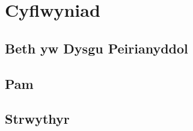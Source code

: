 \chapter{Cyflwyniad}\label{cha:introduction}



\section{Beth yw Dysgu Peirianyddol}\label{sec:intro_pd}






\section{Pam}



\section{Strwythyr}


